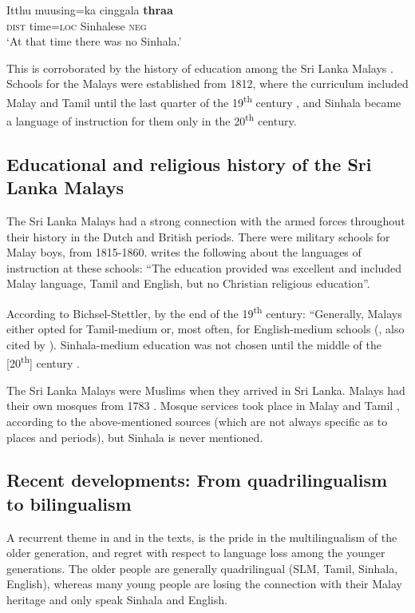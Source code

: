 \ea\label{bakker:ex:1}
\gll Itthu muusing=ka cinggala \textbf{thraa}\\
\textsc{dist} time=\textsc{loc} Sinhalese \textsc{neg}\\
`At that time there was no Sinhala.'
\z

This is corroborated by the history of education among the Sri Lanka Malays \citep[cf.][]{Bichsel1989}. Schools for the Malays were established from 1812, where the curriculum included Malay and Tamil until the last quarter of the 19\textsuperscript{th} century \citep[96-99]{Hussainmiya1990}, and Sinhala became a language of instruction for them only in the 20\textsuperscript{th} century.

\subsection{Educational and religious history of the Sri Lanka Malays}%
The Sri Lanka Malays had a strong connection with the armed forces throughout their history in the Dutch and British periods. There were military schools for Malay boys, from 1815-1860. \citet[96]{Hussainmiya1990} writes the following about the languages of instruction at these schools: ``The education provided was excellent and included Malay language, Tamil and English, but no Christian religious education''.

According to Bichsel-Stettler, by the end of the 19\textsuperscript{th} century: ``Generally, Malays either opted for Tamil-medium or, most often, for English-medium schools (\citet[24]{Bichsel1989}, also cited by \citet[26]{Nordhoff2009}). Sinhala-medium education was not chosen until the middle of the [20\textsuperscript{th}] century \citep[27f]{Bichsel1989}.

The Sri Lanka Malays were Muslims when they arrived in Sri Lanka. Malays had their own mosques from 1783 \citep[47]{Nordhoff2009}. Mosque services took place in Malay and Tamil \citep[124]{Hussainmiya1990}, according to the above-mentioned sources (which are not always specific as to places and periods), but Sinhala is never mentioned.

\subsection{Recent developments: From quadrilingualism to bilingualism}%
A recurrent theme in \citet{Nordhoff2009} and in the texts, is the pride in the multilingualism of the older generation, and regret with respect to language loss among the younger generations. The older people are generally quadrilingual (SLM, Tamil, Sinhala, English), whereas many young people are losing the connection with their Malay heritage and only speak Sinhala and English.


